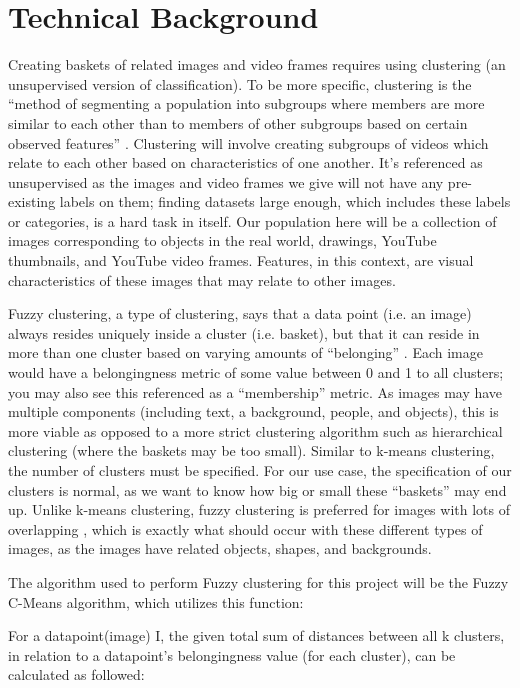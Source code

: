 \documentclass[10pt,twocolumn]{article}
\begin{document}
\section{Technical Background} 

Creating baskets of related images and video frames requires using clustering (an unsupervised version of classification). To be more specific, clustering is the “method of segmenting a population into subgroups where members are more similar to each other than to members of other subgroups based on certain observed features” \cite{C3Clustering}. Clustering will involve creating subgroups of videos which relate to each other based on characteristics of one another. It’s referenced as unsupervised as the images and video frames we give will not have any pre-existing labels on them; finding datasets large enough, which includes these labels or categories, is a hard task in itself. Our population here will be a collection of images corresponding to objects in the real world, drawings, YouTube thumbnails, and YouTube video frames. Features, in this context, are visual characteristics of these images that may relate to other images.

Fuzzy clustering, a type of clustering, says that a data point (i.e. an image) always resides uniquely inside a cluster (i.e. basket), but that it can reside in more than one cluster based on varying amounts of “belonging” \cite{PrasadClustering}. Each image would have a belongingness metric of some value between 0 and 1 to all clusters; you may also see this referenced as a “membership” metric. As images may have multiple components (including text, a background, people, and objects), this is more viable as opposed to a more strict clustering algorithm such as hierarchical clustering (where the baskets may be too small). Similar to k-means clustering, the number of clusters must be specified. For our use case, the specification of our clusters is normal, as we want to know how big or small these “baskets” may end up. Unlike k-means clustering, fuzzy clustering is preferred for images with lots of overlapping \cite{PrasadClustering}, which is exactly what should occur with these different types of images, as the images have related objects, shapes, and backgrounds.

The algorithm used to perform Fuzzy clustering for this project will be the Fuzzy C-Means algorithm, which utilizes this function:

For a datapoint(image) I, the given total sum of distances between all k clusters, in relation to a datapoint's belongingness value (for each cluster),
can be calculated as followed:
\end{document}
